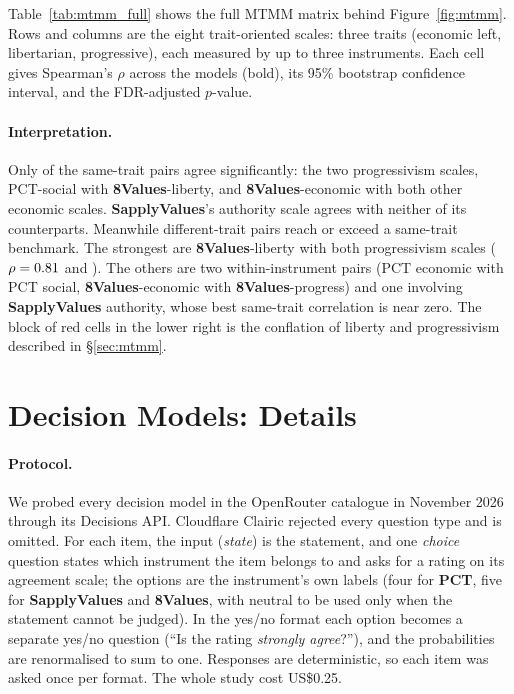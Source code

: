 \documentclass[11pt]{article}
\newcommand{\instPCT}[1]{\textcolor{cPCT}{\textbf{#1}}}
\newcommand{\instSAP}[1]{\textcolor{cSAP}{\textbf{#1}}}
\newcommand{\instEV}[1]{\textcolor{cEV}{\textbf{#1}}}
\newcommand{\pct}{\instPCT{PCT}\xspace}
\newcommand{\sap}{\instSAP{SapplyValues}\xspace}
\newcommand{\ev}{\instEV{8Values}\xspace}
\begin{document}
Table~\ref{tab:mtmm_full} shows the full MTMM matrix behind Figure~\ref{fig:mtmm}. Rows and columns are the eight trait-oriented scales: three traits (economic left, libertarian, progressive), each measured by up to three instruments. Each cell gives Spearman's $\rho$ across the \nNModels{} models (bold), its 95\% bootstrap confidence interval, and the FDR-adjusted $p$-value.


\paragraph{Interpretation.} Only \nNConvSig{} of the \nNConv{} same-trait pairs agree significantly: the two progressivism scales, PCT-social with \ev-liberty, and \ev-economic with both other economic scales. \sap's authority scale agrees with neither of its counterparts. Meanwhile \nNViolations{} different-trait pairs reach or exceed a same-trait benchmark. The strongest are \ev-liberty with both progressivism scales ($\rho=0.81$ and \nRhoLibProgEight). The others are two within-instrument pairs (PCT economic with PCT social, \ev-economic with \ev-progress) and one involving \sap authority, whose best same-trait correlation is near zero. The block of red cells in the lower right is the conflation of liberty and progressivism described in \S\ref{sec:mtmm}.


\section{Decision Models: Details}
\label{app:decision}

\paragraph{Protocol.} We probed every decision model in the OpenRouter catalogue in November 2026 through its Decisions API. Cloudflare Clairic rejected every question type and is omitted. For each item, the input (\emph{state}) is the statement, and one \emph{choice} question states which instrument the item belongs to and asks for a rating on its agreement scale; the options are the instrument's own labels (four for \pct, five for \sap and \ev, with neutral to be used only when the statement cannot be judged). In the yes/no format each option becomes a separate yes/no question (``Is the rating \emph{strongly agree}?''), and the probabilities are renormalised to sum to one. Responses are deterministic, so each item was asked once per format. The whole study cost US\$0.25.
\end{document}
